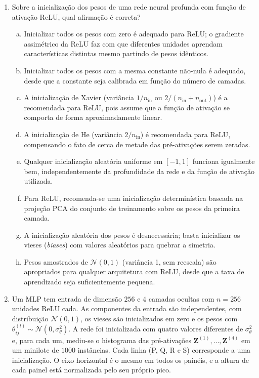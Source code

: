 \documentclass{dlproblemset}
\begin{document}
\begin{enumerate}[1)]
    \item Sobre a inicialização dos pesos de uma rede neural profunda com função de ativação ReLU, qual afirmação é correta?
    \begin{enumerate}[(a)]
        \item Inicializar todos os pesos com zero é adequado para ReLU; o gradiente assimétrico da ReLU faz com que diferentes unidades aprendam características distintas mesmo partindo de pesos idênticos.
        \item Inicializar todos os pesos com a mesma constante não-nula é adequado, desde que a constante seja calibrada em função do número de camadas.
        \item A inicialização de Xavier (variância $1/n_{\text{in}}$ ou $2/(n_{\text{in}} + n_{\text{out}})$) é a recomendada para ReLU, pois assume que a função de ativação se comporta de forma aproximadamente linear.
        \item A inicialização de He (variância $2/n_{\text{in}}$) é recomendada para ReLU, compensando o fato de cerca de metade das pré-ativações serem zeradas.
        \item Qualquer inicialização aleatória uniforme em $[-1, 1]$ funciona igualmente bem, independentemente da profundidade da rede e da função de ativação utilizada.
        \item Para ReLU, recomenda-se uma inicialização determinística baseada na projeção PCA do conjunto de treinamento sobre os pesos da primeira camada.
        \item A inicialização aleatória dos pesos é desnecessária; basta inicializar os vieses (\textit{biases}) com valores aleatórios para quebrar a simetria.
        \item Pesos amostrados de $\mathcal{N}(0, 1)$ (variância 1, sem reescala) são apropriados para qualquer arquitetura com ReLU, desde que a taxa de aprendizado seja suficientemente pequena.
    \end{enumerate}

    \item Um MLP tem entrada de dimensão $256$ e $4$ camadas ocultas com $n = 256$ unidades ReLU cada. As componentes da entrada são independentes, com distribuição $\mathcal{N}(0, 1)$, os vieses são inicializados em zero e os pesos com $\theta^{(l)}_{ij} \sim \mathcal{N}(0, \sigma_\theta^2)$. A rede foi inicializada com quatro valores diferentes de $\sigma_\theta^2$ e, para cada um, mediu-se o histograma das pré-ativações $\mathbf{Z}^{(1)}, \ldots, \mathbf{Z}^{(4)}$ em um minilote de $1000$ instâncias. Cada linha (P, Q, R e S) corresponde a uma inicialização. O eixo horizontal é o mesmo em todos os painéis, e a altura de cada painel está normalizada pelo seu próprio pico.


\end{enumerate}
\end{document}

